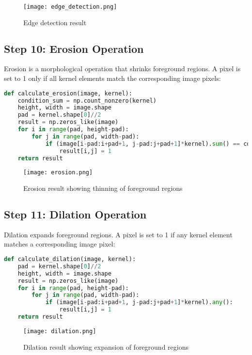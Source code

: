 \documentclass[12pt]{article}
\begin{document}
\begin{figure}[H]
    \centering
    \texttt{[image: edge\_detection.png]}
    \caption{Edge detection result}
    \label{fig:edge}
\end{figure}

\subsection{Step 10: Erosion Operation}
Erosion is a morphological operation that shrinks foreground regions. A pixel is set to 1 only if all kernel elements match the corresponding image pixels:
\begin{lstlisting}[language=Python]
def calculate_erosion(image, kernel):
    condition_sum = np.count_nonzero(kernel)
    height, width = image.shape
    pad = kernel.shape[0]//2
    result = np.zeros_like(image)
    for i in range(pad, height-pad):
        for j in range(pad, width-pad):
            if (image[i-pad:i+pad+1, j-pad:j+pad+1]*kernel).sum() == condition_sum:
                result[i,j] = 1
    return result
\end{lstlisting}

\begin{figure}[H]
    \centering
    \texttt{[image: erosion.png]}
    \caption{Erosion result showing thinning of foreground regions}
    \label{fig:erosion}
\end{figure}

\subsection{Step 11: Dilation Operation}
Dilation expands foreground regions. A pixel is set to 1 if any kernel element matches a corresponding image pixel:
\begin{lstlisting}[language=Python]
def calculate_dilation(image, kernel):
    pad = kernel.shape[0]//2
    height, width = image.shape
    result = np.zeros_like(image)
    for i in range(pad, height-pad):
        for j in range(pad, width-pad):
            if (image[i-pad:i+pad+1, j-pad:j+pad+1]*kernel).any():
                result[i,j] = 1
    return result
\end{lstlisting}

\begin{figure}[H]
    \centering
    \texttt{[image: dilation.png]}
    \caption{Dilation result showing expansion of foreground regions}
    \label{fig:dilation}
\end{figure}
\end{document}

